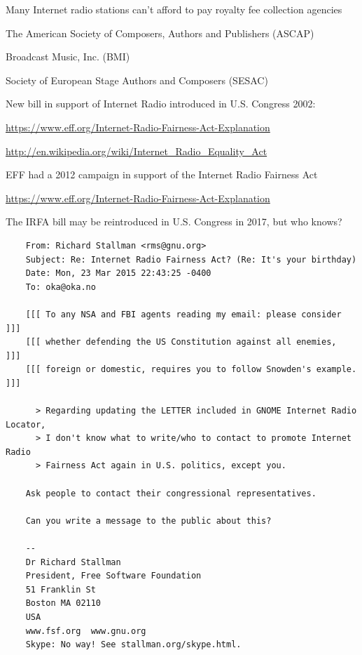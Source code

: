 \documentclass[20pt,landscape]{foils}
\begin{document}
\begin{list1}
\item Many Internet radio stations can't afford to pay royalty fee collection agencies
  \begin{list2}
  \item The American Society of Composers, Authors and Publishers (ASCAP)
  \item Broadcast Music, Inc. (BMI)
    \item Society of European Stage Authors and Composers (SESAC)
  \end{list2}
  \item New bill in support of Internet Radio introduced in U.S. Congress 2002:
  \begin{list2}
  \item \url{https://www.eff.org/Internet-Radio-Fairness-Act-Explanation}
  \item \url{http://en.wikipedia.org/wiki/Internet_Radio_Equality_Act}
  \end{list2}
\item EFF had a 2012 campaign in support of the Internet Radio Fairness Act
  \begin{list2}
  \item \url{https://www.eff.org/Internet-Radio-Fairness-Act-Explanation}
  \end{list2}
\item The IRFA bill may be reintroduced in U.S. Congress in 2017, but who knows?
\end{list1}


\begin{list1}
\item
  \begin{tiny}
\begin{verbatim}
    From: Richard Stallman <rms@gnu.org>
    Subject: Re: Internet Radio Fairness Act? (Re: It's your birthday)
    Date: Mon, 23 Mar 2015 22:43:25 -0400
    To: oka@oka.no

    [[[ To any NSA and FBI agents reading my email: please consider    ]]]
    [[[ whether defending the US Constitution against all enemies,     ]]]
    [[[ foreign or domestic, requires you to follow Snowden's example. ]]]

      > Regarding updating the LETTER included in GNOME Internet Radio Locator,
      > I don't know what to write/who to contact to promote Internet Radio
      > Fairness Act again in U.S. politics, except you.

    Ask people to contact their congressional representatives.

    Can you write a message to the public about this?

    -- 
    Dr Richard Stallman
    President, Free Software Foundation
    51 Franklin St
    Boston MA 02110
    USA
    www.fsf.org  www.gnu.org
    Skype: No way! See stallman.org/skype.html.
\end{verbatim}
  \end{tiny}
\end{list1}  
\end{document}
